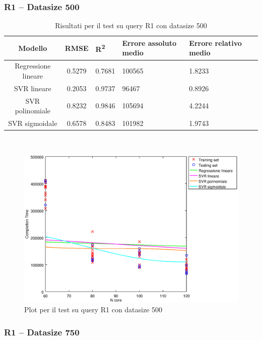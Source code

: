 \documentclass[a4paper,11pt]{article}
\begin{document}
\newpage

\newpage
\subsubsection{R1 -- Datasize 500}

\begin{table}[bhpt]
	\centering
	\begin{adjustbox}{center}
		\begin{tabular}{c | c M{1.2cm} M{2.5cm} M{2.5cm} M{1.8cm}}
			Modello & RMSE & R\textsuperscript{2} & Errore assoluto medio & Errore relativo medio \tabularnewline
			\hline
			Regressione lineare & 0.5279 & 0.7681 & 100565 & 1.8233 \\
			SVR lineare & 0.2053 & 0.9737 &  96467 & 0.8926 \\
			SVR polinomiale & 0.8232 & 0.9846 & 105694 & 4.2244 \\
			SVR sigmoidale & 0.6578 & 0.8483 & 101982 & 1.9743 \\
		\end{tabular}
	\end{adjustbox}
	\\
	\caption{Risultati per il test su query R1 con datasize 500}
	\label{table_R1_500}
\end{table}

\begin {figure}[hbt]
\centering
\includegraphics[width=\textwidth]{output/R1_500/plot_R1_500.eps}
\caption {Plot per il test su query R1 con datasize 500}
\end {figure}

\newpage

\newpage
\subsubsection{R1 -- Datasize 750}
\end{document}
